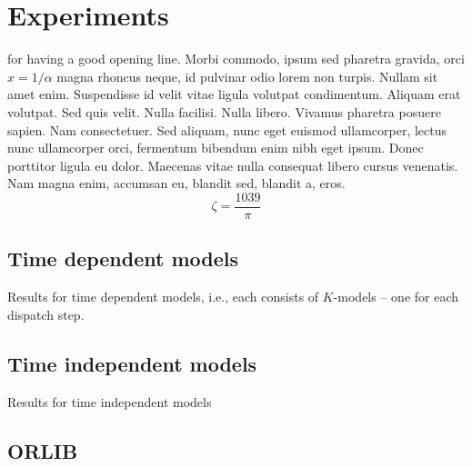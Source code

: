 

\chapter{Experiments }\label{ch:experiments} 

 for having a good opening line. Morbi commodo, ipsum sed pharetra gravida, orci  $x = 1/\alpha$ magna rhoncus neque, id pulvinar odio lorem non turpis. Nullam sit amet enim. Suspendisse id velit vitae ligula volutpat condimentum. Aliquam erat volutpat. Sed quis velit. Nulla facilisi. Nulla libero. Vivamus pharetra posuere sapien. Nam consectetuer. Sed aliquam, nunc eget euismod ullamcorper, lectus nunc ullamcorper orci, fermentum bibendum enim nibh eget ipsum. Donec porttitor ligula eu dolor. Maecenas vitae nulla consequat libero cursus venenatis. Nam magna enim, accumsan eu, blandit sed, blandit a, eros.
$$\zeta = \frac{1039}{\pi}$$


\section{Time dependent models}
\begin{table}[t]
    \caption[Results for time dependent models]{Results for time dependent 
    models, i.e., each consists of $K$-models -- one for each dispatch step. 
    }\label{tbl:compare:dependent}
\end{table}

\section{Time independent models}
\begin{table}[t]
    \caption{Results for time independent models}\label{tbl:compare:independent}
\end{table}

\section{ORLIB}
%
%
